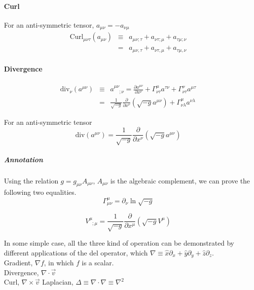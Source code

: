 \documentclass[12pt,a4paper]{book}
\begin{document}
\paragraph{Curl}For an anti-symmetric tensor, $a_{\mu\nu}=-a_{\nu\mu}$
\begin{eqnarray}
\mathrm{Curl}_{\mu\nu\tau}(a_{\mu\nu})&\equiv& a_{\mu\nu;\tau}+a_{\nu\tau;\mu}+a_{\tau\mu;\nu} \\
&=&a_{\mu\nu,\tau}+a_{\nu\tau,\mu}+a_{\tau\mu,\nu}
\end{eqnarray}

\paragraph{Divergence}

\begin{eqnarray}
\mathrm{div}_\nu(a^{\mu\nu})&\equiv& a^{\mu\nu}_{\phantom{\mu\nu};\nu}=\frac{\partial a^{\mu\nu}}{\partial x^\nu}+\Gamma^\mu_{\nu\tau}a^{\tau\nu}+\Gamma^\nu_{\nu\tau}a^{\mu\tau} \\
&=&\frac1{\sqrt{-g}}\frac{\partial}{\partial x^\nu}(\sqrt{-g}a^{\mu\nu})+\Gamma^\mu_{\nu\lambda}a^{\nu\lambda}
\end{eqnarray}

For an anti-symmetric tensor
\begin{equation}
\mathrm {div}(a^{\mu\nu})=\frac1{\sqrt{-g}}\frac{\partial}{\partial x^\nu}(\sqrt{-g}a^{\mu\nu})
\end{equation}

\subparagraph{Annotation} Using the relation $g=g_{\mu\nu}A_{\mu\nu}$, $A_{\mu\nu}$ is the algebraic complement, we can prove the following two equalities.
\begin{equation}
\Gamma^\mu_{\mu\nu}=\partial_\nu\ln{\sqrt{-g}}
\end{equation}

\begin{equation}
V^\mu_{\phantom\mu;\mu}=\frac1{\sqrt{-g}}\frac{\partial}{\partial x^\mu}(\sqrt{-g}V^\mu)
\end{equation}

In some simple case, all the three kind of operation can be demonstrated by different applications of the del operator, which $\nabla\equiv \hat x\partial_x+\hat y\partial_y+\hat z \partial_z$. \\
Gradient,  $\nabla f$, in which $f$ is a scalar. \\
Divergence, $\nabla\cdot \vec v$ \\
Curl, $\nabla \times \vec v$
Laplacian, $\Delta\equiv \nabla\cdot\nabla\equiv \nabla^2$
\end{document}
